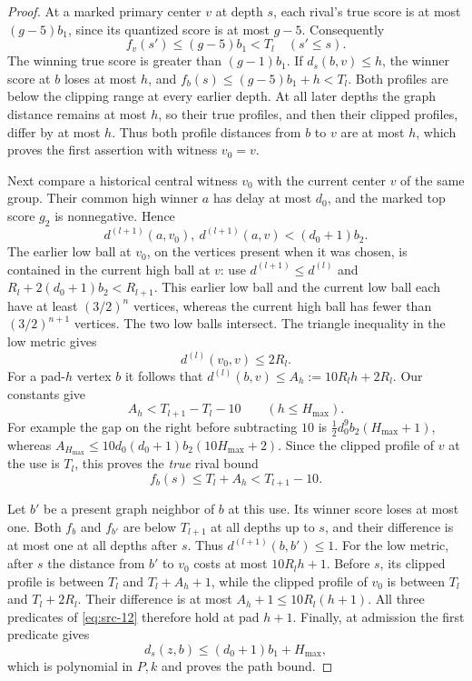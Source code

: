 \begin{proof}
At a marked primary center $v$ at depth $s$, each rival's true score is
at most $(g-5)b_1$, since its quantized score is at most $g-5$.
Consequently
\[
 f_v(s')\le(g-5)b_1<T_l\quad(s'\le s).
\]
The winning true score is greater than $(g-1)b_1$.  If $d_s(b,v)\le h$,
the winner score at $b$ loses at most $h$, and
$f_b(s)\le(g-5)b_1+h<T_l$.  Both profiles are below the clipping range
at every earlier depth.  At all later depths the graph distance remains
at most $h$, so their true profiles, and then their clipped profiles,
differ by at most $h$.  Thus both profile distances from $b$ to $v$ are
at most $h$, which proves the first assertion with witness $v_0=v$.

Next compare a historical central witness $v_0$ with the current center
$v$ of the same group.  Their common high winner $a$ has delay at most
$d_0$, and the marked top score $g_2$ is nonnegative.  Hence
\[
 d^{(l+1)}(a,v_0),\ d^{(l+1)}(a,v)<(d_0+1)b_2.
\]
The earlier low ball at $v_0$, on the vertices present when it was
chosen, is contained in the current high ball at $v$: use
$d^{(l+1)}\le d^{(l)}$ and
$R_l+2(d_0+1)b_2<R_{l+1}$.  This earlier low ball and the current low
ball each have at least $(3/2)^n$ vertices, whereas the current high
ball has fewer than $(3/2)^{n+1}$ vertices.  The two low balls intersect.
The triangle inequality in the low metric gives
\[
 d^{(l)}(v_0,v)\le2R_l.
\]
For a pad-$h$ vertex $b$ it follows that
$d^{(l)}(b,v)\le A_h:=10R_lh+2R_l$.  Our constants give
\[
 A_h<T_{l+1}-T_l-10\qquad(h\le H_{\max}).
\]
For example the gap on the right before subtracting $10$ is
$\tfrac12d_0^9b_2(H_{\max}+1)$, whereas
$A_{H_{\max}}\le10d_0(d_0+1)b_2(10H_{\max}+2)$.
Since the clipped profile of $v$ at the use is $T_l$, this proves the
\emph{true} rival bound
\[
 f_b(s)\le T_l+A_h<T_{l+1}-10.
\]

Let $b'$ be a present graph neighbor of $b$ at this use.  Its winner score loses
at most one.  Both $f_b$ and $f_{b'}$ are below $T_{l+1}$ at all depths
up to $s$, and their difference is at most one at all depths after $s$.
Thus $d^{(l+1)}(b,b')\le1$.  For the low metric, after $s$ the distance
from $b'$ to $v_0$ costs at most $10R_lh+1$.  Before $s$, its clipped
profile is between $T_l$ and $T_l+A_h+1$, while the clipped profile of
$v_0$ is between $T_l$ and $T_l+2R_l$.  Their difference is at most
$A_h+1\le10R_l(h+1)$.  All three predicates of
\eqref{eq:src-12} therefore hold at pad $h+1$.  Finally, at admission
the first predicate gives
\[
 d_s(z,b)\le(d_0+1)b_1+H_{\max},
\]
which is polynomial in $P,k$ and proves the path bound.


\end{proof}
